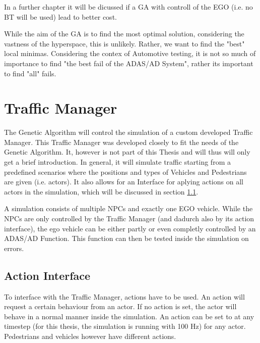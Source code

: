 In a further chapter it will be dicussed if a GA with controll of the EGO (i.e. no BT will be used) lead to better cost.

While the aim of the GA is to find the most optimal solution, considering the vastness of the hyperspace, this is unlikely. Rather, we want to find the "best" local minimas. Considering the contex of Automotive testing, it is not so much of importance to find "the best fail of the ADAS/AD System", rather its important to find "all" fails.



\section{Traffic Manager}
The Genetic Algorithm will control the simulation of a custom developed Traffic Manager. This Traffic Manager was developed closely to fit the needs of the Genetic Algorithm. 
It, however is not part of this Thesis and will thus will only get a brief introduction. 
In general, it will simulate traffic starting from a predefined scenarios where the positions and types of Vehicles and Pedestrians are given (i.e. actors). It also allows for an Interface for aplying actions on all actors in the simulation, which will be discussed in section \ref{implementation:action_interface}.

A simulation consists of multiple NPCs and exactly one EGO vehicle. While the NPCs are only controlled by the Traffic Manager (and dadurch also by its action interface), the ego vehicle can be either partly or even completly controlled by an ADAS/AD Function. This function can then be tested inside the simulation on errors.


\subsection{Action Interface}
\label{implementation:action_interface}
To interface with the Traffic Manager, actions have to be used. An action will request a certain behaviour from an actor. If no action is set, the actor will behave in a normal manner inside the simulation. An action can be set to at any timestep (for this thesis, the simulation is running with 100 Hz) for any actor. Pedestrians and vehicles however have different actions.

